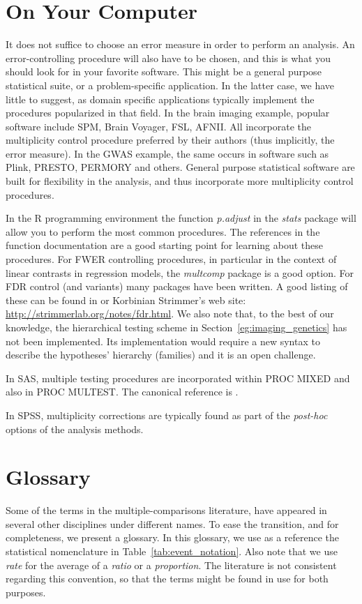 \documentclass[review,12pt]{article}
\theoremstyle{definition}
\theoremstyle{definition}
\begin{document}
\section{\label{sec:on_your_pc} On Your Computer}
It does not suffice to choose an error measure in order to perform an analysis. An error-controlling procedure will also have to be chosen, and this is what you should look for in your favorite software. This might be a general purpose statistical suite, or a problem-specific application. In the latter case, we have little to suggest, as domain specific applications typically implement the procedures popularized in that field. 
In the brain imaging example, popular software include SPM, Brain Voyager, FSL, AFNII. All incorporate the multiplicity control procedure preferred by their authors (thus implicitly, the error measure). 
In the GWAS example, the same occurs in software such as Plink, PRESTO, PERMORY and others. 
General purpose statistical software are built for flexibility in the analysis, and thus incorporate more multiplicity control procedures. 

In the R programming environment \citep{r_development_core_team_r:_2011} the function \emph{p.adjust} in the \emph{stats} package will allow you to perform the most common procedures. The references in the function documentation are a good starting point for learning about these procedures. 
For FWER controlling procedures, in particular in the context of linear contrasts in regression models, the \emph{multcomp} package is a good option. 
For FDR control (and variants) many packages have been written. A good listing of these can be found in \citet{bretz_multiple_2010} or Korbinian Strimmer's web site: \url{http://strimmerlab.org/notes/fdr.html}. 
We also note that, to the best of our knowledge, the hierarchical testing scheme in Section~\ref{eg:imaging_genetics} has not been implemented. Its implementation would require a new syntax to describe the hypotheses' hierarchy (families) and it is an open challenge. 

In SAS, multiple testing procedures are incorporated within PROC MIXED and also in PROC MULTEST.  The canonical reference is \citet{westfall_multiple_2011}. 

In SPSS, multiplicity corrections are typically found as part of the \emph{post-hoc} options of the analysis methods.



\section{\label{sec:glossary} Glossary}
Some of the terms in the multiple-comparisons literature, have appeared in several other disciplines under different names. To ease the transition, and for completeness, we present a glossary. 
In this glossary, we use as a reference the statistical nomenclature in Table~\ref{tab:event_notation}. Also note that we use \emph{rate} for the average of a \emph{ratio} or a \emph{proportion}. The literature is not consistent regarding this convention, so that the terms might be found in use for both purposes.
\end{document}
